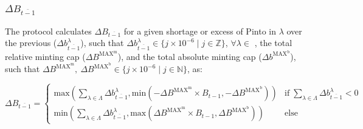 \documentclass[class=article, crop=false]{standalone}
\begin{document}
\subsubsection{$\Delta B_{\overline{t-1}}$}

The protocol calculates $\Delta B_{\overline{t-1}}$ for a given shortage or excess of Pinto in $\lambda$ over the previous  ($\Delta b_{\overline{t-1}}^{\lambda}$), such that $\Delta b_{\overline{t-1}}^{\lambda} \in \{j \times 10^{-6} \mid j \in \mathbb{Z} \}$, $\forall \lambda \in$ , the total relative minting cap ($\Delta B^{\text{MAX}^{\text{m}}}$), and the total absolute minting cap ($\Delta b^{\text{MAX}^{\text{b}}}$), such that $\Delta B^{\text{MAX}^{\text{m}}},\ \Delta B^{\text{MAX}^{\text{b}}} \in \{j \times 10^{-6} \mid j \in \mathbb{N} \}$, as:

    $$
        \Delta B_{\overline{t-1}} = 
            \begin{cases} 
                \text{max}\left(
                         \sum\limits_{\lambda \in \Lambda} \Delta b_{\overline{t-1}}^{\lambda}, 
                        \text{min}(-\Delta B^{\text{MAX}^{\text{m}}} \times B_{t-1},
                        -\Delta B^{\text{MAX}^{\text{b}}}) \right)
                    & \text{if} \; \sum\limits_{\lambda \in \Lambda} \Delta b_{\overline{t-1}}^{\lambda} < 0 \\ 
                
                \text{min}\left(
                         \sum\limits_{\lambda \in \Lambda} \Delta b_{\overline{t-1}}^{\lambda}, 
                        \text{max}(\Delta B^{\text{MAX}^{\text{m}}} \times B_{t-1},
                        \Delta B^{\text{MAX}^{\text{b}}}) \right)
                    & \text{else} 
            \end{cases}
    $$
\end{document}
